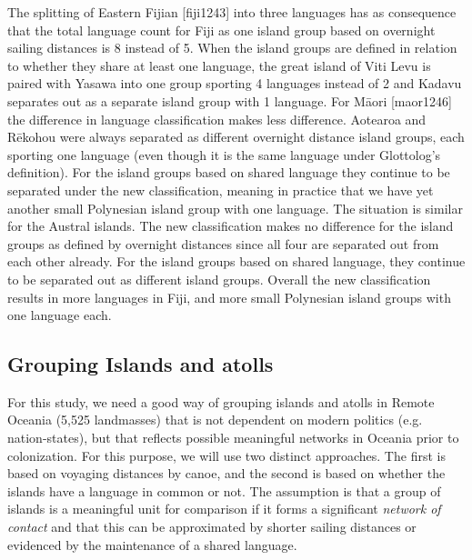 \documentclass[12pt,letterpaper]{article}
\begin{document}
The splitting of Eastern Fijian [fiji1243] into three languages has as consequence that the total language count for Fiji as one island group based on overnight sailing distances is 8 instead of 5. When the island groups are defined in relation to whether they share at least one language, the great island of Viti Levu is paired with Yasawa into one group sporting 4 languages instead of 2 and Kadavu separates out as a separate island group with 1 language. For M\={a}ori [maor1246] the difference in language classification makes less difference. Aotearoa and  R\={e}kohou were always separated as different overnight distance island groups, each sporting one language (even though it is the same language under Glottolog's definition). For the island groups based on shared language they continue to be separated under the new classification, meaning in practice that we have yet another small Polynesian island group with one language. The situation is similar for the Austral islands. The new classification makes no difference for the island groups as defined by overnight distances since all four are separated out from each other already. For the island groups based on shared language, they continue to be separated out as different island groups. Overall the new classification results in more languages in Fiji, and more small Polynesian island groups with one language each.


\FloatBarrier
\subsection{Grouping Islands and atolls}
\label{appendix_sec:island_geo}


For this study, we need a good way of grouping islands and atolls in Remote Oceania (5,525 landmasses) that is not dependent on modern politics (e.g. nation-states), but that reflects possible meaningful networks in Oceania prior to colonization. For this purpose, we will use two distinct approaches. The first is based on voyaging distances by canoe, and the second is based on whether the islands have a language in common or not. The assumption is that a group of islands is a meaningful unit for comparison if it forms a significant \textit{network of contact} and that this can be approximated by shorter sailing distances or evidenced by the maintenance of a shared language. 
\end{document}
